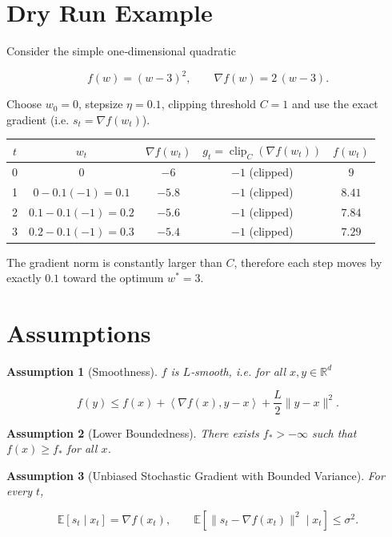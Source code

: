 \documentclass{article}
\newtheorem{assumption}{Assumption}
\newcommand{\E}{\mathbb{E}}
\newcommand{\R}{\mathbb{R}}
\newcommand{\ip}[2]{\left\langle #1,#2\right\rangle}
\begin{document}
\section*{Dry Run Example}
Consider the simple one‑dimensional quadratic  

\[
f(w)=(w-3)^{2},
\qquad \nabla f(w)=2\,(w-3).
\]

Choose $w_{0}=0$, stepsize $\eta=0.1$, clipping threshold $C=1$ and use the
exact gradient (i.e. $s_{t}=\nabla f(w_{t})$).  

\begin{center}
\begin{tabular}{c|c|c|c|c}
$t$ & $w_{t}$ & $\nabla f(w_{t})$ & $g_{t}=\operatorname{clip}_{C}(\nabla f(w_{t}))$ & $f(w_{t})$ \\
\hline
0 & $0$ & $-6$ & $-1$ (clipped) & $9$ \\
1 & $0-0.1(-1)=0.1$ & $-5.8$ & $-1$ (clipped) & $8.41$ \\
2 & $0.1-0.1(-1)=0.2$ & $-5.6$ & $-1$ (clipped) & $7.84$ \\
3 & $0.2-0.1(-1)=0.3$ & $-5.4$ & $-1$ (clipped) & $7.29$ \\
\end{tabular}
\end{center}

The gradient norm is constantly larger than $C$, therefore each step moves
by exactly $0.1$ toward the optimum $w^{*}=3$.

\section*{Assumptions}
\begin{assumption}[Smoothness]\label{ass:smooth}
$f$ is $L$‑smooth, i.e. for all $x,y\in\R^{d}$  

\[
f(y)\le f(x)+\ip{\nabla f(x)}{y-x}+\frac{L}{2}\|y-x\|^{2}.
\]
\end{assumption}

\begin{assumption}[Lower Boundedness]\label{ass:lb}
There exists $f_{*}>-\infty$ such that $f(x)\ge f_{*}$ for all $x$.
\end{assumption}

\begin{assumption}[Unbiased Stochastic Gradient with Bounded Variance]\label{ass:sg}
For every $t$,  

\[
\E\!\left[s_{t}\mid x_{t}\right]=\nabla f(x_{t}),\qquad
\E\!\left[\|s_{t}-\nabla f(x_{t})\|^{2}\mid x_{t}\right]\le\sigma^{2}.
\]
\end{assumption}
\end{document}
